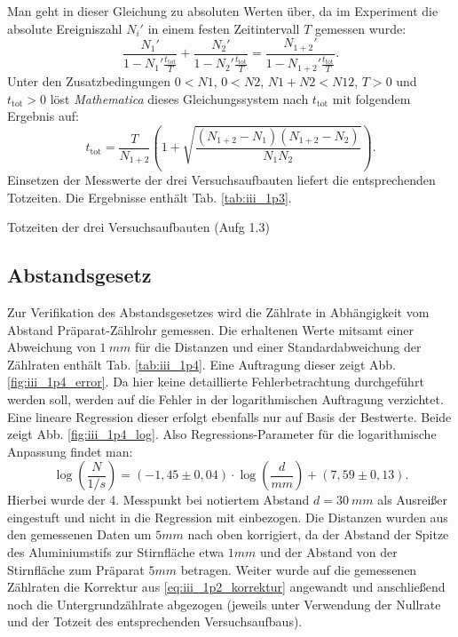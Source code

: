 Man geht in dieser Gleichung zu absoluten Werten über, da im Experiment die absolute Ereigniszahl $N_i'$ in einem festen Zeitintervall $T$ gemessen wurde:
\begin{equation}
\frac{N_1'}{1-N_1'\frac{t_\mathrm{tot}}{T}} + \frac{N_2'}{1-N_2'\frac{t_\mathrm{tot}}{T}} = \frac{N_{1+2}'}{1-N_{1+2}'\frac{t_\mathrm{tot}}{T}}.
\end{equation}
Unter den Zusatzbedingungen $0 < N1$, $0 < N2$, $N1 + N2 < N12$, $T > 0$ und $t_\mathrm{tot} > 0$ löst \textit{Mathematica} dieses Gleichungssystem nach $t_\mathrm{tot}$ mit folgendem Ergebnis auf:
\begin{equation}
t_\mathrm{tot} = \frac{T}{N_{1+2}}\left(1+\sqrt{\frac{(N_{1+2}-N_1)(N_{1+2}-N_2)}{N_1 N_2}}\right).
\end{equation}
Einsetzen der Messwerte der drei Versuchsaufbauten liefert die entsprechenden Totzeiten. Die Ergebnisse enthält Tab. \ref{tab:iii_1p3}.

\begin{table}[ht]
\centering
\caption{Totzeiten der drei Versuchsaufbauten (Aufg 1.3)}
\label{tab:iii_1p3}

\end{table}

\subsection{Abstandsgesetz}
Zur Verifikation des Abstandsgesetzes wird die Zählrate in Abhängigkeit vom Abstand Präparat-Zählrohr gemessen. Die erhaltenen Werte mitsamt einer Abweichung von $\SI{1}{mm}$ für die Distanzen und einer Standardabweichung der Zählraten enthält Tab. \ref{tab:iii_1p4}. Eine Auftragung dieser zeigt Abb. \ref{fig:iii_1p4_error}. Da hier keine detaillierte Fehlerbetrachtung durchgeführt werden soll, werden auf die Fehler in der logarithmischen Auftragung verzichtet. Eine lineare Regression dieser erfolgt ebenfalls nur auf Basis der Bestwerte. Beide zeigt Abb. \ref{fig:iii_1p4_log}. Also Regressions-Parameter für die logarithmische Anpassung findet man:
\begin{equation}
\log\left(\frac{N}{\si{1/s}}\right) = (-1,45 \pm 0,04) \cdot \log\left(\frac{d}{\si{mm}}\right) + (7,59 \pm 0,13).
\end{equation}
Hierbei wurde der 4. Messpunkt bei notiertem Abstand $d = \SI{30}{mm}$ als Ausreißer eingestuft und nicht in die Regression mit einbezogen. Die Distanzen wurden aus den gemessenen Daten um $\si{5}{mm}$ nach oben korrigiert, da der Abstand der Spitze des Aluminiumstifs zur Stirnfläche etwa $\si{1}{mm}$ und der Abstand von der Stirnfläche zum Präparat $\si{5}{mm}$ betragen. Weiter wurde auf die gemessenen Zählraten die Korrektur aus \eqref{eq:iii_1p2_korrektur} angewandt und anschließend noch die Untergrundzählrate abgezogen (jeweils unter Verwendung der Nullrate und der Totzeit des entsprechenden Versuchsaufbaus).

